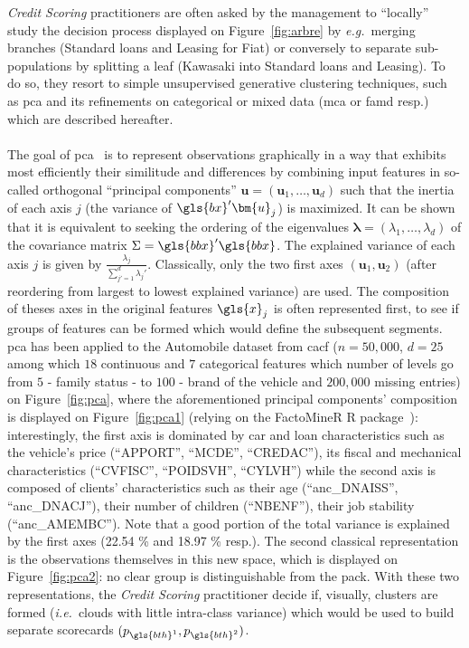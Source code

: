 \textit{Credit Scoring} practitioners are often asked by the management to ``locally'' study the decision process displayed on Figure~\ref{fig:arbre} by \textit{e.g.}\ merging branches (Standard loans and Leasing for Fiat) or conversely to separate sub-populations by splitting a leaf (Kawasaki into Standard loans and Leasing). To do so, they resort to simple unsupervised generative clustering techniques, such as \gls{pca} and its refinements on categorical or mixed data (\gls{mca} or \gls{famd} resp.) which are described hereafter.

\paragraph{}

The goal of \gls{pca}~\cite{pages2014multiple} is to represent observations graphically in a way that exhibits most efficiently their similitude and differences by combining input features in so-called orthogonal ``principal components'' $\bm{u} = (\bm{u}_1,\dots,\bm{u}_d)$ such that the inertia of each axis $j$ (the variance of $\gls{bx}' \bm{u}_j$) is maximized. It can be shown that it is equivalent to seeking the ordering of the eigenvalues $\bm{\lambda} = (\lambda_1,\dots,\lambda_d)$ of the covariance matrix $\Sigma = \gls{bbx}'\gls{bbx}$. The explained variance of each axis $j$ is given by $\frac{\lambda_j}{\sum_{j'=1}^d \lambda_j'}$. Classically, only the two first axes $(\bm{u}_1,\bm{u}_2)$ (after reordering from largest to lowest explained variance) are used. The composition of theses axes in the original features $\gls{x}_j$ is often represented first, to see if groups of features can be formed which would define the subsequent segments. \gls{pca} has been applied to the Automobile dataset from \gls{cacf} ($n = 50{,}000$, $d = 25$ among which $18$ continuous and $7$ categorical features which number of levels go from $5$ - family status - to $100$ - brand of the vehicle and $200{,}000$ missing entries) on Figure~\ref{fig:pca}, where the aforementioned principal components' composition is displayed on Figure~\ref{fig:pca1} (relying on the FactoMineR \textsc{R} package~\cite{JSSv025i01}): interestingly, the first axis is dominated by car and loan characteristics such as the vehicle's price (``APPORT'', ``MCDE'', ``CREDAC''), its fiscal and mechanical characteristics (``CVFISC'', ``POIDSVH'', ``CYLVH'') while the second axis is composed of clients' characteristics such as their age (``anc\_DNAISS'', ``anc\_DNACJ''), their number of children (``NBENF''), their job stability (``anc\_AMEMBC''). Note that a good portion of the total variance is explained by the first axes (22.54 \% and 18.97 \% resp.). The second classical representation is the observations themselves in this new space, which is displayed on Figure~\ref{fig:pca2}: no clear group is distinguishable from the pack. With these two representations, the \textit{Credit Scoring} practitioner decide if, visually, clusters are formed (\textit{i.e.}\ clouds with little intra-class variance) which would be used to build separate scorecards $(p_{\gls{bth}^{1}},p_{\gls{bth}^{2}})$.

